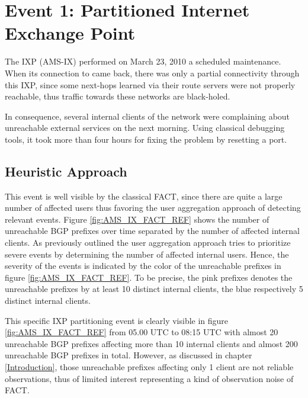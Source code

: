 

\section{Event 1: Partitioned Internet Exchange Point}

The IXP \citet{AMS-IX}(AMS-IX) performed on March 23, 2010 a scheduled maintenance. When its connection to \citet{switch} came back, there was only a partial connectivity through this IXP, since some next-hops learned via their route servers were not properly reachable, thus traffic towards these networks are black-holed.\citep{SchatzmannPAM2011}

In consequence, several internal clients of the \citet{switch} network were complaining about unreachable external services on the next morning. Using classical debugging tools, it took more than four hours for fixing the problem by resetting a port.\citep{SchatzmannPAM2011}

\subsection{Heuristic Approach}
This event is well visible by the classical FACT, since there are quite a large number of affected users thus favoring the user aggregation approach of detecting relevant events. Figure \ref{fig:AMS_IX_FACT_REF} shows the number of unreachable BGP prefixes over time separated by the number of affected internal clients. As previously outlined the user aggregation approach tries to prioritize severe events by determining the number of affected internal users. Hence, the severity of the events is indicated by the color of the unreachable prefixes in figure \ref{fig:AMS_IX_FACT_REF}. To be precise, the pink prefixes denotes the unreachable prefixes by at least 10 distinct internal clients, the blue respectively 5 distinct internal clients.

This specific IXP partitioning event is clearly visible in figure  \ref{fig:AMS_IX_FACT_REF} from 05.00 UTC to 08:15 UTC with almost 20 unreachable BGP prefixes affecting more than 10 internal clients and almost 200 unreachable BGP prefixes in total. However, as discussed in chapter \ref{Introduction}, those unreachable prefixes affecting only 1 client are not reliable observations, thus of limited interest representing a kind of observation noise of FACT.

